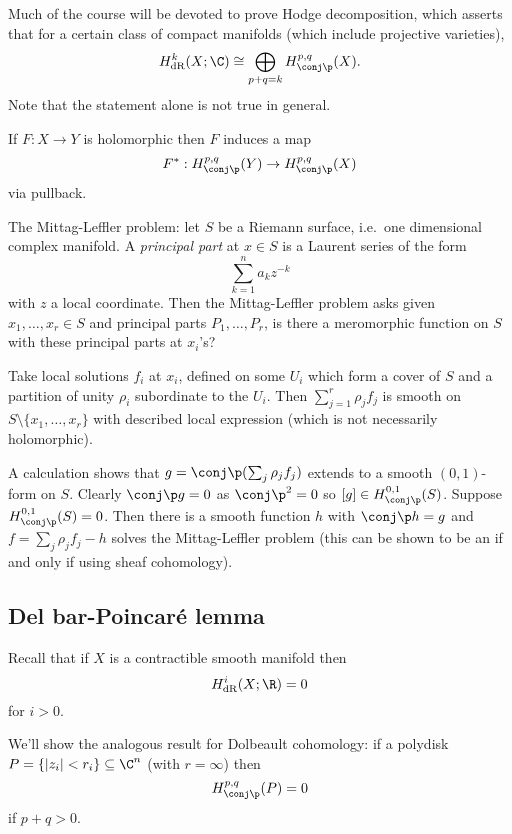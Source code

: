 \documentclass[a4paper]{article}
\begin{document}
Much of the course will be devoted to prove Hodge decomposition, which asserts that for a certain class of compact manifolds (which include projective varieties),
\[
  H_{\text{dR}}^k(X; \C) \cong \bigoplus_{p + q = k} H_{\conj \p}^{p, q}(X).
\]
Note that the statement alone is not true in general.

\begin{ex}
  If \(F: X \to Y\) is holomorphic then \(F\) induces a map
  \[
    F^*: H_{\conj \p}^{p, q}(Y) \to H_{\conj \p}^{p, q}(X)
  \]
  via pullback.
\end{ex}

The Mittag-Leffler problem:  let \(S\) be a Riemann surface, i.e.\ one dimensional complex manifold. A \emph{principal part} at \(x \in S\) is a Laurent series of the form
\[
  \sum_{k = 1}^n a_k z^{-k}
\]
with \(z\) a local coordinate. Then the Mittag-Leffler problem asks given \(x_1, \dots, x_r \in S\) and principal parts \(P_1, \dots, P_r\), is there a meromorphic function on \(S\) with these principal parts at \(x_i\)'s?

Take local solutions \(f_i\) at \(x_i\), defined on some \(U_i\) which form a cover of \(S\)  and a partition of unity \(\rho_i\) subordinate to the \(U_i\). Then \(\sum_{j = 1}^r \rho_j f_j\) is smooth on \(S \setminus \{x_1, \dots, x_r\}\) with described local expression (which is not necessarily holomorphic).

A calculation shows that \(g = \conj \p (\sum_j \rho_j f_j)\) extends to a smooth \((0, 1)\)-form on \(S\). Clearly \(\conj \p g = 0\) as \(\conj \p^2 = 0\) so \([g] \in H_{\conj \p}^{0, 1}(S)\). Suppose \(H_{\conj \p}^{0, 1}(S) = 0\). Then there is a smooth function \(h\) with \(\conj \p h = g\) and \(f = \sum_j \rho_j f_j - h\) solves the Mittag-Leffler problem (this can be shown to be an if and only if using sheaf cohomology).

\subsection{Del bar-Poincaré lemma}

Recall that if \(X\) is a contractible smooth manifold then
\[
  H_{\text{dR}}^i (X; \R) = 0
\]
for \(i > 0\).

We'll show the analogous result for Dolbeault cohomology: if a polydisk \(P = \{|z_i| < r_i\} \subseteq \C^n\) (with \(r = \infty\)) then
\[
  H_{\conj \p}^{p, q}(P) = 0
\]
if \(p + q > 0\).
\end{document}
